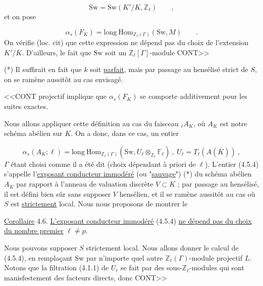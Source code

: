 \begin{equation}\tag{4.5.2}
\mathrm{Sw} = \mathrm{Sw}(K'/K,\mathbb{Z}_\ell) \qquad ,
\end{equation}
et on pose

\begin{equation}\tag{4.5.3}
\alpha_s(F_K) = \mathrm{long}\ \mathrm{Hom}_{\mathbb{Z}_\ell(\Gamma)}(\mathrm{Sw},M) \qquad .
\end{equation}
On vérifie (loc. cit) que cette expression ne dépend pas du choix de l'extension $K'/K$. D'ailleurs, le fait que $\mathrm{Sw}$ soit un $\mathbb{Z}_\ell[\Gamma]$-module CONT>>

(*) Il suffirait en fait que $k$ soit \underline{parfait}, mais par passage au hensélisé strict de $S$, on se ramène aussitôt au cas envisagé.



<<CONT projectif implique que $\alpha_s(F_K)$ se comporte additivement pour les suites exactes.

Nous allons appliquer cette définition au cas du faisceau ${}_\ell A_K$, où $A_K$ est notre schéma abélien sur $K$. On a donc, dans ce cas, un entier

\begin{equation}\tag{4.5.4}
\alpha_s(A_K;\ell) = \mathrm{long}\ \mathrm{Hom}_{\mathbb{Z}_\ell(\Gamma)}(\mathrm{Sw},U_\ell \otimes_{\mathbb{Z}_\ell} \mathbb{F}_\ell) \ , \ U_\ell = T_\ell(A(\overline{K})) \ ,
\end{equation}
$\Gamma$ étant choisi comme il a été dit (choix dépendant à priori de $\ell$). L'entier (4.5.4) s'appelle l'\underline{exposant conducteur immodéré} (ou "\underline{sauvage}") (*) du schéma abélien $A_K$ par rapport à l'anneau de valuation discrète $V \subset K$ ; par passage au hensélisé, il est défini bien sûr sans supposer $V$ hensélien, et il se ramène aussitôt au cas où $S$ est \underline{strictement} local. Nous nous proposons de montrer le

\underline{Corollaire} 4.6. \underline{L'exposant conducteur immodéré} (4.5.4) \underline{ne dépend pas du choix du nombre premier} $\ell \neq p$.

Nous pouvons supposer $S$ strictement local. Nous allons donner le calcul de (4.5.4), en remplaçant $\mathrm{Sw}$ par n'importe quel autre $\mathbb{Z}_\ell(\Gamma)$-module projectif $L$. Notons que la filtration (4.1.1) de $U_\ell$ se fait par des sous-$\mathbb{Z}_\ell$-modules qui sont manisfestement des facteurs directs, donc CONT>>

